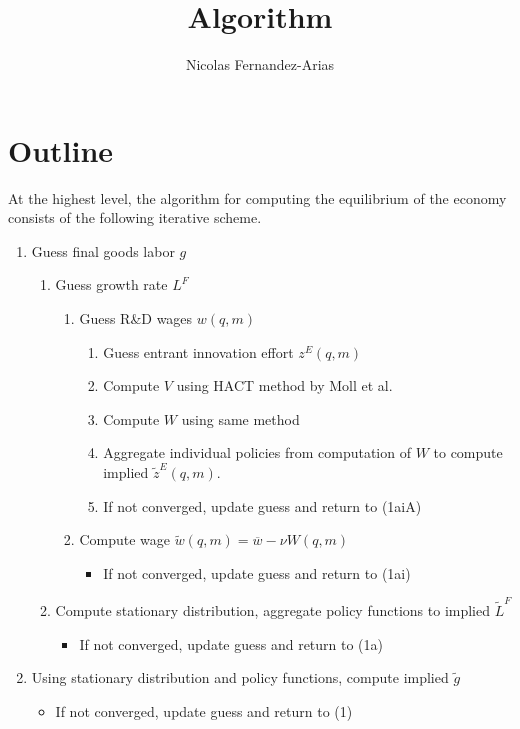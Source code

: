\documentclass[12pt,english]{article}
\theoremstyle{remark}
\begin{document}
	
	
\title{Algorithm}
\author{Nicolas Fernandez-Arias}
\maketitle
	
\section{Outline}

At the highest level, the algorithm for computing the equilibrium of the economy consists of the following iterative scheme. 

\begin{enumerate}
	\item Guess final goods labor $g$
	\begin{enumerate}
		\item Guess growth rate $L^F$
		\begin{enumerate}
			\item Guess R\&D wages $w(q,m)$
			\begin{enumerate}
				\item Guess entrant innovation effort $z^E(q,m)$
				\item Compute $V$ using HACT method by Moll et al.
				\item Compute $W$ using same method 
				\item Aggregate individual policies from computation of $W$ to compute implied $\tilde{z}^E(q,m)$. 
				\item If not converged, update guess and return to (1aiA) 
			\end{enumerate}
			\item Compute wage $\tilde{w}(q,m) = \overline{w} - \nu W(q,m)$
			\begin{itemize}
				\item If not converged, update guess and return to (1ai) 	
			\end{itemize}
		\end{enumerate}
		\item Compute stationary distribution, aggregate policy functions to implied $\tilde{L}^F$
		\begin{itemize}
			\item If not converged, update guess and return to (1a)
		\end{itemize}
	\end{enumerate}
	\item Using stationary distribution and policy functions, compute implied $\tilde{g}$
	\begin{itemize}
		\item If not converged, update guess and return to (1)
	\end{itemize} 
\end{enumerate}
\end{document}
